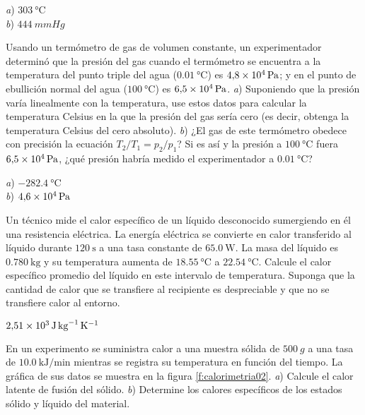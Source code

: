 \begin{Answer}
	\begin{minipage}[t]{.4\textwidth}
    \textit{a}) $\SI{303}{\celsius}$\\ \textit{b}) $\SI{444}{mmHg}$
  \end{minipage}
\end{Answer}
%
\begin{Exercise}
  Usando un termómetro de gas de volumen constante, un experimentador determinó que la presión del gas cuando el termómetro se encuentra a la temperatura del punto triple del agua ($\SI{0.01}{\celsius}$) es $\SI{4.8E4}{\pascal}$; y en el  punto de ebullición normal del agua ($\SI{100}{\celsius}$) es $\SI{6.5E4}{\pascal}$. \textit{a}) Suponiendo que la presión varía linealmente con la temperatura, use estos datos para calcular la temperatura Celsius en la que la presión del gas sería cero (es decir, obtenga la temperatura Celsius del cero absoluto). \textit{b}) ¿El gas de este termómetro obedece con precisión la ecuación $T_2/T_1=p_2/p_1$? Si es así y la presión a $\SI{100}{\celsius}$ fuera $\SI{6.5E4}{\pascal}$, ¿qué presión habría medido el experimentador a $\SI{0.01}{\celsius}$?
\end{Exercise}
\begin{Answer}
	\begin{minipage}[t]{.4\textwidth}
    \textit{a}) $\SI{-282.4}{\celsius}$\\ \textit{b}) $\SI{4.6E4}{\pascal}$
  \end{minipage}
\end{Answer}
%
\begin{Exercise}\label{p:calorimetria01}
  Un técnico mide el calor específico de un líquido desconocido sumergiendo en él una resistencia eléctrica. La energía eléctrica se convierte en calor transferido al líquido durante $\SI{120}{\second}$ a una tasa constante de $\SI{65.0}{\watt}$. La masa del líquido es $\SI{0.780}{\kilogram}$ y su temperatura aumenta de $\SI{18.55}{\celsius}$ a $\SI{22.54}{\celsius}$. Calcule el calor específico promedio del líquido en este intervalo de temperatura. Suponga que la cantidad de calor que se transfiere al recipiente es despreciable y que no se transfiere calor al entorno.
\end{Exercise}
\begin{Answer}
  $\SI{2.51E3}{\joule.\kilogram^{-1}.\kelvin^{-1}}$
\end{Answer}
%
\begin{Exercise}\label{p:calorimetria02}
  En un experimento se suministra calor a una muestra sólida de $\SI{500}{g}$ a una tasa de $\SI{10.0}{\kilo\joule/\minute}$ mientras se registra su temperatura en función del tiempo. La gráfica de sus datos se muestra en la figura \ref{f:calorimetria02}. \textit{a}) Calcule el calor latente de fusión del sólido. \textit{b}) Determine los calores específicos de los estados sólido y líquido del material.
\end{Exercise}
